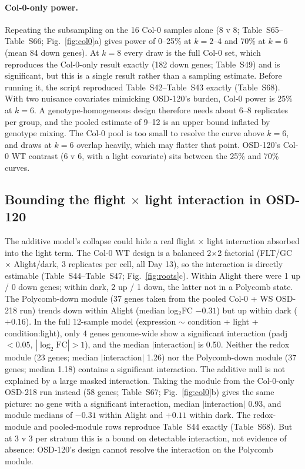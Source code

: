 \documentclass[11pt,a4paper]{article}
\newcommand{\Sx}[1]{Table~S#1}
\begin{document}
\paragraph{Col-0-only power.} Repeating the subsampling on the 16 Col-0 samples alone (8 v 8; \Sx{65}--\Sx{66};
Fig.~\ref{fig:col0}a) gives power of 0--25\% at $k=2$--4 and 70\% at $k=6$ (mean 84 down genes). At $k=8$
every draw is the full Col-0 set, which reproduces the Col-0-only result exactly (182 down genes; \Sx{49}) and is
significant, but this is a single result rather than a sampling estimate. Before running it, the script reproduced
\Sx{42}--\Sx{43} exactly (\Sx{68}). With two nuisance covariates mimicking OSD-120's burden, Col-0 power is 25\% at
$k=6$. A genotype-homogeneous design therefore needs about 6--8 replicates per group, and the pooled estimate of
9--12 is an upper bound inflated by genotype mixing. The Col-0 pool is too small to resolve the curve above $k=6$,
and draws at $k=6$ overlap heavily, which may flatter that point. OSD-120's Col-0 WT contrast (6 v 6, with a light
covariate) sits between the 25\% and 70\% curves.

\subsection{Bounding the flight $\times$ light interaction in OSD-120}

The additive model's collapse could hide a real flight $\times$ light interaction absorbed into the
light term. The Col-0 WT design is a balanced 2$\times$2 factorial (FLT/GC $\times$
Alight/dark, 3 replicates per cell, all Day 13), so the interaction is directly estimable
(\Sx{44}--\Sx{47}; Fig.~\ref{fig:roots}c). Within Alight there were 1 up / 0 down genes; within dark, 2 up / 1 down,
the latter not in a Polycomb state. The Polycomb-down module (37 genes taken from the pooled Col-0 + WS OSD-218 run) trends down within Alight
(median log$_2$FC $-0.31$) but up within dark ($+0.16$). In the full 12-sample model
(expression $\sim$ condition + light + condition:light), only 4 genes genome-wide show
a significant interaction (padj $<0.05$, $|\log_2\mathrm{FC}|>1$), and the median $|$interaction$|$ is 0.50.
Neither the redox module (23 genes; median $|$interaction$|$ 1.26) nor the Polycomb-down
module (37 genes; median 1.18) contains a significant interaction. The additive null
is not explained by a large masked interaction. Taking the module from the Col-0-only OSD-218 run instead
(58 genes; \Sx{67}; Fig.~\ref{fig:col0}b) gives the same picture: no gene with a significant interaction, median
$|$interaction$|$ 0.93, and module medians of $-0.31$ within Alight and $+0.11$ within dark. The redox-module and
pooled-module rows reproduce \Sx{44} exactly (\Sx{68}). But at 3 v 3 per stratum this is a bound on
detectable interaction, not evidence of absence: OSD-120's design cannot resolve the
interaction on the Polycomb module.
\end{document}
